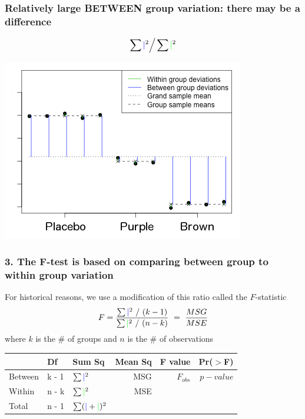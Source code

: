 \documentclass[11pt,containsverbatim,handout,xcolor=xelatex,dvipsnames,table]{beamer}
\begin{document}

\begin{frame}
\frametitle{Relatively large BETWEEN group variation: there may be a difference}

\[ \sum {\color{blue} \mid}^2 \Big/ \sum {\color{green} \mid}^2 \]

\begin{center}
\includegraphics[scale=0.6]{figures/anova-lots-of-between-group-jelly-bean}
\end{center}

\end{frame}


\begin{frame}
\frametitle{3. The F-test is based on comparing between group to within group variation}

For historical reasons, we use a modification of this ratio called the $F$-statistic
\[ F = \frac{\sum {\color{blue} \mid}^2 ~ / ~ (k - 1)}{\sum {\color{green} \mid}^2 ~ / ~ (n - k)} ~ =  ~ \frac{MSG}{MSE} \]
where $k$ is the \# of groups and $n$ is the \# of observations

\pause

{\small
\begin{center}
\begin{tabular}{lllrrr}
\hline
		& Df  	& Sum Sq 								& Mean Sq	& F value 		& Pr($>$F) \\ 
\hline
Between 	& k - 1 	& $\sum {\color{blue}\mid}^2$  					& MSG 		& $F_{obs}$ 	& $p-value$ \\ 
Within  	& n - k 	& $\sum {\color{green}\mid}^2$ 				& MSE 		&		 	&  \\ 
\hline
Total		& n - 1 	& $\sum ({\color{blue}\mid} + {\color{green}\mid})^2$	&                	&                	&
\end{tabular}
\end{center}
}

\end{frame}
\end{document}
